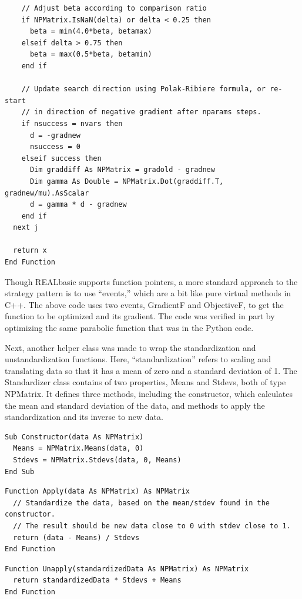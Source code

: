 \documentclass{article}
\begin{document}
\begin{lstlisting}
    // Adjust beta according to comparison ratio
    if NPMatrix.IsNaN(delta) or delta < 0.25 then
      beta = min(4.0*beta, betamax)
    elseif delta > 0.75 then
      beta = max(0.5*beta, betamin)
    end if
    
    // Update search direction using Polak-Ribiere formula, or re-start
    // in direction of negative gradient after nparams steps.
    if nsuccess = nvars then
      d = -gradnew
      nsuccess = 0
    elseif success then
      Dim graddiff As NPMatrix = gradold - gradnew
      Dim gamma As Double = NPMatrix.Dot(graddiff.T, gradnew/mu).AsScalar
      d = gamma * d - gradnew
    end if
  next j
  
  return x
End Function
\end{lstlisting}

Though REALbasic supports function pointers, a more standard approach to the strategy pattern is to use ``events,'' which are a bit like pure virtual methods in C++.  The above code uses two events, GradientF and ObjectiveF, to get the function to be optimized and its gradient.  The code was verified in part by optimizing the same parabolic function that was in the Python code.

Next, another helper class was made to wrap the standardization and unstandardization functions.  Here, ``standardization'' refers to scaling and translating data so that it has a mean of zero and a standard deviation of 1.  The Standardizer class contains of two properties, Means and Stdevs, both of type NPMatrix.  It defines three methods, including the constructor, which calculates the mean and standard deviation of the data, and methods to apply the standardization and its inverse to new data.

\begin{lstlisting}
Sub Constructor(data As NPMatrix)
  Means = NPMatrix.Means(data, 0)
  Stdevs = NPMatrix.Stdevs(data, 0, Means)
End Sub
\end{lstlisting}

\begin{lstlisting}
Function Apply(data As NPMatrix) As NPMatrix
  // Standardize the data, based on the mean/stdev found in the constructor.
  // The result should be new data close to 0 with stdev close to 1.  
  return (data - Means) / Stdevs
End Function
\end{lstlisting}

\begin{lstlisting}
Function Unapply(standardizedData As NPMatrix) As NPMatrix
  return standardizedData * Stdevs + Means
End Function
\end{lstlisting}
\end{document}

